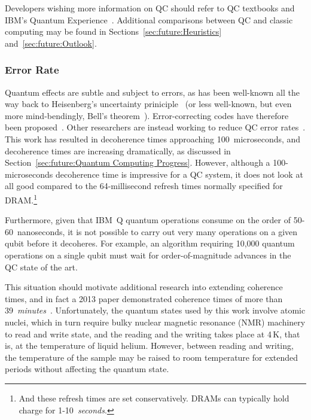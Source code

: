 Developers wishing more information on QC should refer to QC textbooks
and IBM's Quantum Experience~\cite{IBM2016QuantumExperience}.
Additional comparisons between QC and classic computing may be
found in Sections~\ref{sec:future:Heuristics} and~\ref{sec:future:Outlook}.

\subsubsection{Error Rate}
\label{sec:future:Error Rate}

Quantum effects are subtle and subject to errors, as has been
well-known all the way back to
Heisenberg's uncertainty priniciple~\cite{WeinerHeisenberg1927Uncertain}
(or less well-known, but even more mind-bendingly,
Bell's theorem~\cite{JohnSBell1964EPRparadox}).
Error-correcting codes have therefore been
proposed~\cite{ADCorcoles2015QuantumErrorDetection}.
Other researchers are instead working to reduce QC error
rates~\cite{PhysRevB.77.180502,PhysRevLett.107.240501,PhysRevLett.111.080502,PhysRevB.86.100506,KristanTemme2016QC-error-mitigation}.
This work has resulted in decoherence times approaching 100~microseconds,
and decoherence times are increasing dramatically, as discussed in
Section~\ref{sec:future:Quantum Computing Progress}.
However, although a 100-microseconds decoherence time is impressive for
a QC system, it does not look at all good compared to the 64-millisecond
refresh times normally specified for DRAM.\footnote{
	And these refresh times are set conservatively.
	DRAMs can typically hold charge for 1-10~\emph{seconds}.}

Furthermore, given that IBM~Q quantum operations consume on the order of
50-60~nanoseconds, it is not possible to carry out very many
operations on a given qubit before it decoheres.
For example, an algorithm requiring 10,000 quantum operations on
a single qubit must wait for order-of-magnitude advances in
the QC state of the art.

This situation should motivate additional research into extending
coherence times, and in fact a 2013 paper demonstrated coherence
times of more than
39~\emph{minutes}~\cite{KamyarSaeedi2018QC-39-minutes}.
Unfortunately, the quantum states used by this work involve atomic nuclei,
which in turn require bulky nuclear magnetic resonance (NMR) machinery
to read and write state, and the reading and the writing takes place
at 4\,K, that is, at the temperature of liquid helium.
However, between reading and writing, the temperature of the sample may
be raised to room temperature for extended periods without affecting
the quantum state.


